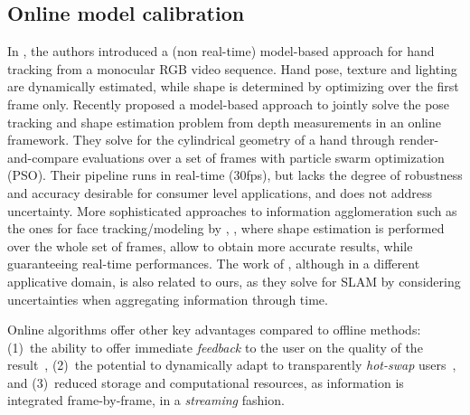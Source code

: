 \subsection*{Online model calibration}
In \cite{delagorce2011model}, the authors introduced a (non real-time) model-based approach for hand tracking from a monocular RGB video sequence. Hand pose, texture and lighting are dynamically estimated, while shape is determined by optimizing over the first frame only.
Recently \cite{makris2015model} proposed a model-based approach to jointly solve the pose tracking and shape estimation problem from depth measurements in an online framework. They solve for the cylindrical geometry of a hand through render-and-compare evaluations over a set of frames with particle swarm optimization (PSO). Their pipeline runs in real-time (30fps), but lacks the degree of robustness and accuracy desirable for consumer level applications, and does not address uncertainty.
More sophisticated approaches to information agglomeration such as the ones for face tracking/modeling by \cite{bouaziz2013online}, \cite{li_sig13} , where shape estimation is performed over the whole set of frames, allow to obtain more accurate results, while guaranteeing real-time performances. 
The work of \cite{zou2013coslam}, although in a different applicative domain, is also related to ours, as they solve for SLAM by considering uncertainties when aggregating information through time.

Online algorithms offer other key advantages compared to offline methods: (1)~the ability to offer immediate \emph{feedback} to the user on the quality of the result~\cite{kinfu}, (2)~the potential to dynamically adapt to transparently \emph{hot-swap} users~\cite{bouaziz2013online}, and (3)~reduced storage and computational resources, as information is integrated frame-by-frame, in a \emph{streaming} fashion.


